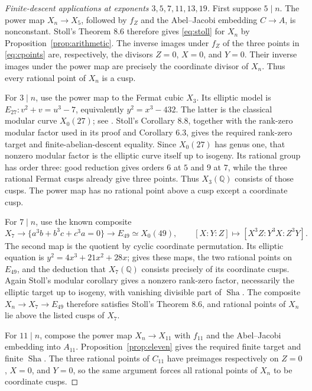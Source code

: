 \documentclass[11pt]{article}
\newcommand{\Q}{\mathbb Q}
\numberwithin{equation}{section}
\newcommand{\Sha}{\operatorname{Sha}}
\theoremstyle{definition}
\begin{document}










\begin{proof}[Finite-descent applications at exponents \(3,5,7,11,13,19\)]
First suppose $5\mid n$. The power map $X_n\to X_5$, followed by $f_Z$ and the Abel--Jacobi
embedding $C\to A$, is nonconstant. Stoll's Theorem 8.6 therefore gives
\eqref{eq:stoll} for $X_n$ by Proposition~\ref{prop:arithmetic}.
The inverse images under $f_Z$ of the three points in \eqref{eq:cpoints} are,
respectively, the divisors $Z=0$, $X=0$, and $Y=0$. Their inverse
images under the power map are precisely the coordinate divisor of
$X_n$. Thus every rational point of $X_n$ is a cusp.

For $3\mid n$, use the power map to the Fermat cubic $X_3$. Its
elliptic model is $E_{27}:v^2+v=u^3-7$, equivalently
$y^2=x^3-432$. The latter is the classical modular curve $X_0(27)$;
see \citet[\S10.1]{KrizLi2019}. Stoll's Corollary 8.8, together with
the rank-zero modular factor used in its proof and Corollary 6.3,
gives the required rank-zero target and finite-abelian-descent
equality. Since $X_0(27)$ has genus one, that nonzero modular factor
is the elliptic curve itself up to isogeny. Its rational group has
order three: good reduction gives orders $6$ at $5$ and $9$ at $7$,
while the three rational Fermat cusps already give three points.
Thus $X_3(\Q)$ consists of those cusps. The power map has no rational
point above a cusp except a coordinate cusp.

For $7\mid n$, use the known composite
\[
X_7\longrightarrow
\{a^3b+b^3c+c^3a=0\}\longrightarrow E_{49}\simeq X_0(49),
\qquad
[X:Y:Z]\longmapsto[X^3Z:Y^3X:Z^3Y].
\]
The second map is the quotient by cyclic coordinate permutation.
Its elliptic equation is $y^2=4x^3+21x^2+28x$;
\citet[\S2, equation (2.10), pp.~68--69; \S3.1--3.2, pp.~72--74]{Elkies1998}
gives these maps, the two rational points on $E_{49}$, and the
deduction that $X_7(\Q)$ consists precisely of its coordinate cusps.
Again Stoll's modular corollary gives a nonzero rank-zero factor,
necessarily the elliptic target up to isogeny, with vanishing
divisible part of $\Sha$. The composite $X_n\to X_7\to E_{49}$
therefore satisfies Stoll's Theorem 8.6, and rational points of
$X_n$ lie above the listed cusps of $X_7$.

For $11\mid n$, compose the power map $X_n\to X_{11}$ with
$f_{11}$ and the Abel--Jacobi embedding into $A_{11}$.
Proposition~\ref{prop:eleven} gives the required finite target and
finite $\Sha$. The three rational points of $C_{11}$ have preimages
respectively on $Z=0$, $X=0$, and $Y=0$, so the same argument forces
all rational points of $X_n$ to be coordinate cusps.


\end{proof}
\end{document}
